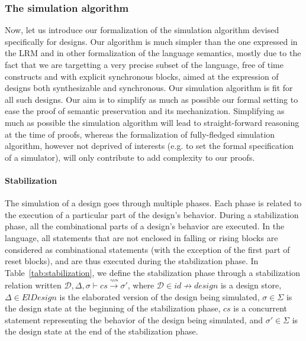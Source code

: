 \subsubsection{The simulation algorithm}
\label{subsubsec:sim-algo}

Now, let us introduce our formalization of the simulation algorithm
devised specifically for \hvhdl{} designs. Our algorithm is much
simpler than the one expressed in the \vhdl{} LRM\cite{VHDL2000} and
in other formalization of the \vhdl{} language
semantics\cite{Borger1995}, mostly due to the fact that we are
targetting a very precise subset of the language, free of time
constructs and with explicit synchronous blocks, aimed at the
expression of designs both synthesizable and synchronous. Our
simulation algorithm is fit for all such designs. Our aim is to
simplify as much as possible our formal setting to ease the proof of
semantic preservation and its mechanization. Simplifying as much as
possible the simulation algorithm will lead to straight-forward
reasoning at the time of proofs, whereas the formalization of
fully-fledged simulation algorithm, however not deprived of interests
(e.g. to set the formal specification of a \vhdl{} simulator), will
only contribute to add complexity to our proofs.

\paragraph{Stabilization}

The simulation of a \hvhdl{} design goes through multiple phases. Each
phase is related to the execution of a particular part of the design's
behavior. During a stabilization phase, all the combinational parts of
a design's behavior are executed. In the \hvhdl{} language, all
statements that are not enclosed in falling or rising blocks are
considered as combinational statements (with the exception of the
first part of reset blocks), and are thus executed during the
stabilization phase. In Table~\ref{tab:stabilization}, we define the
stabilization phase through a stabilization relation written
$\mathcal{D},\Delta,\sigma\vdash{}cs\xrightarrow{\rightsquigarrow}\sigma'$,
where $\mathcal{D}\in{}id\nrightarrow{}design$ is a design store,
$\Delta\in{}ElDesign$ is the elaborated version of the design being
simulated, $\sigma\in{}\Sigma$ is the design state at the beginning of
the stabilization phase, $cs$ is a concurrent statement representing
the behavior of the design being simulated, and $\sigma'\in\Sigma$ is
the design state at the end of the stabilization phase.

